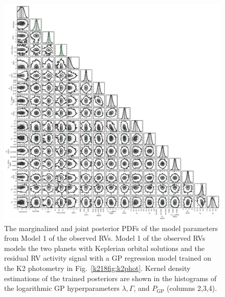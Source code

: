 \begin{figure}
\centering
\includegraphics[width=\hsize]{figures/cornerRC_K218.png}
\caption{The marginalized and joint posterior PDFs of the model parameters from Model 1 of
  the observed RVs. Model 1 of the observed RVs models the two planets with Keplerian orbital
  solutions and the residual RV activity signal with a GP regression model trained on the K2 photometry in
  Fig.~\ref{k218fig:k2phot}. Kernel density estimations of the trained posteriors are shown in the
  histograms of the logarithmic GP hyperparameters $\lambda, \Gamma$, and $P_{\text{GP}}$
  (columns 2,3,4). \label{k218fig:cornerRV}}
\end{figure}

